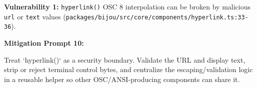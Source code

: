 \textbf{Vulnerability 1:} \texttt{h\allowbreak{}y\allowbreak{}p\allowbreak{}e\allowbreak{}r\allowbreak{}l\allowbreak{}i\allowbreak{}n\allowbreak{}k\allowbreak{}(\allowbreak{})} OSC 8 interpolation can be broken by malicious \texttt{u\allowbreak{}r\allowbreak{}l} or \texttt{t\allowbreak{}e\allowbreak{}x\allowbreak{}t} values (\texttt{p\allowbreak{}a\allowbreak{}c\allowbreak{}k\allowbreak{}a\allowbreak{}g\allowbreak{}e\allowbreak{}s\allowbreak{}/\allowbreak{}b\allowbreak{}i\allowbreak{}j\allowbreak{}o\allowbreak{}u\allowbreak{}/\allowbreak{}s\allowbreak{}r\allowbreak{}c\allowbreak{}/\allowbreak{}c\allowbreak{}o\allowbreak{}r\allowbreak{}e\allowbreak{}/\allowbreak{}c\allowbreak{}o\allowbreak{}m\allowbreak{}p\allowbreak{}o\allowbreak{}n\allowbreak{}e\allowbreak{}n\allowbreak{}t\allowbreak{}s\allowbreak{}/\allowbreak{}h\allowbreak{}y\allowbreak{}p\allowbreak{}e\allowbreak{}r\allowbreak{}l\allowbreak{}i\allowbreak{}n\allowbreak{}k\allowbreak{}.\allowbreak{}t\allowbreak{}s\allowbreak{}:\allowbreak{}3\allowbreak{}3\allowbreak{}-\allowbreak{}3\allowbreak{}6}).

\textbf{Mitigation Prompt 10:}

\begin{CodeBlock}
Treat `hyperlink()` as a security boundary. Validate the URL and display text, strip or reject terminal control bytes, and centralize the escaping/validation logic in a reusable helper so other OSC/ANSI-producing components can share it.
\end{CodeBlock}

